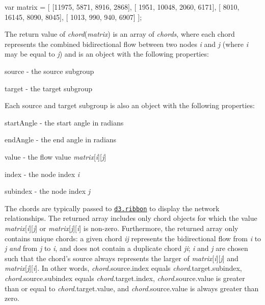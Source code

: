 \begin{DoxyCode}
var matrix = [
  [11975,  5871, 8916, 2868],
  [ 1951, 10048, 2060, 6171],
  [ 8010, 16145, 8090, 8045],
  [ 1013,   990,  940, 6907]
];
\end{DoxyCode}


The return value of {\itshape chord}({\itshape matrix}) is an array of {\itshape chords}, where each chord represents the combined bidirectional flow between two nodes {\itshape i} and {\itshape j} (where {\itshape i} may be equal to {\itshape j}) and is an object with the following properties\+:


\begin{DoxyItemize}
\item {\ttfamily source} -\/ the source subgroup
\item {\ttfamily target} -\/ the target subgroup
\end{DoxyItemize}

Each source and target subgroup is also an object with the following properties\+:


\begin{DoxyItemize}
\item {\ttfamily start\+Angle} -\/ the start angle in radians
\item {\ttfamily end\+Angle} -\/ the end angle in radians
\item {\ttfamily value} -\/ the flow value {\itshape matrix}\mbox{[}{\itshape i}\mbox{]}\mbox{[}{\itshape j}\mbox{]}
\item {\ttfamily index} -\/ the node index {\itshape i}
\item {\ttfamily subindex} -\/ the node index {\itshape j}
\end{DoxyItemize}

The chords are typically passed to \href{#ribbon}{\tt d3.\+ribbon} to display the network relationships. The returned array includes only chord objects for which the value {\itshape matrix}\mbox{[}{\itshape i}\mbox{]}\mbox{[}{\itshape j}\mbox{]} or {\itshape matrix}\mbox{[}{\itshape j}\mbox{]}\mbox{[}{\itshape i}\mbox{]} is non-\/zero. Furthermore, the returned array only contains unique chords\+: a given chord {\itshape ij} represents the bidirectional flow from {\itshape i} to {\itshape j} {\itshape and} from {\itshape j} to {\itshape i}, and does not contain a duplicate chord {\itshape ji}; {\itshape i} and {\itshape j} are chosen such that the chord’s source always represents the larger of {\itshape matrix}\mbox{[}{\itshape i}\mbox{]}\mbox{[}{\itshape j}\mbox{]} and {\itshape matrix}\mbox{[}{\itshape j}\mbox{]}\mbox{[}{\itshape i}\mbox{]}. In other words, {\itshape chord}.source.\+index equals {\itshape chord}.target.\+subindex, {\itshape chord}.source.\+subindex equals {\itshape chord}.target.\+index, {\itshape chord}.source.\+value is greater than or equal to {\itshape chord}.target.\+value, and {\itshape chord}.source.\+value is always greater than zero.


